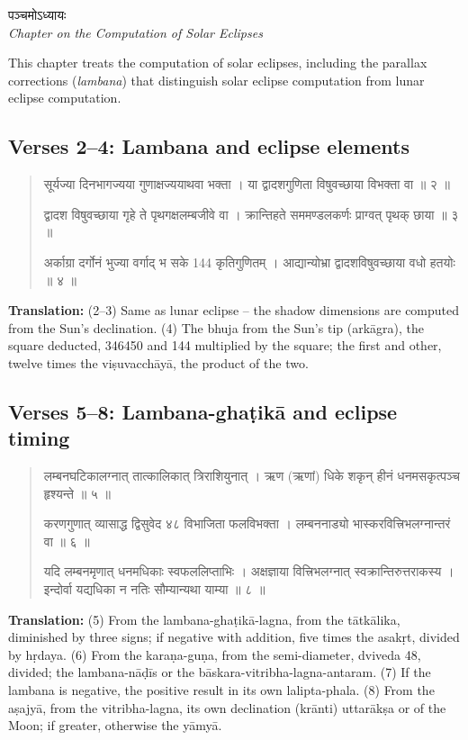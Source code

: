 \documentclass[11pt,a4paper]{article}
\newcommand{\dev}[1]{{\devanagarifont #1}}
\newenvironment{sanskritverse}{%
  \begin{quote}%
  \devanagarifont%
  \setlength{\leftmargin}{2em}%
}{\end{quote}}
\begin{document}
\begin{center}
\dev{पञ्चमोऽध्यायः}\\[0.2cm]
\textit{Chapter on the Computation of Solar Eclipses}
\end{center}

This chapter treats the computation of solar eclipses, including the parallax 
corrections (\textit{lambana}) that distinguish solar eclipse computation from lunar 
eclipse computation.

\subsection*{Verses 2--4: Lambana and eclipse elements}

\begin{sanskritverse}
\dev{सूर्यज्या दिनभागज्यया गुणाक्षज्ययाथवा भक्ता} ।
\dev{या द्वादशगुणिता विषुवच्छाया विभक्ता वा ॥ २ ॥}

\dev{द्वादश विषुवच्छाया गृहे ते पृथगक्षलम्बजीवे वा} ।
\dev{क्रान्तिहते सममण्डलकर्णः प्राग्वत् पृथक् छाया ॥ ३ ॥}

\dev{अर्काग्रा दर्गोनं भुज्या वर्गाद् भ सके 144 कृतिगुणितम्} ।
\dev{आद्यान्योभ्रा द्वादशविषुवच्छाया वधो हतयोः ॥ ४ ॥}
\end{sanskritverse}

\textbf{Translation:} (2--3) Same as lunar eclipse -- the shadow dimensions are computed 
from the Sun's declination. (4) The bhuja from the Sun's tip (arkāgra), the square 
deducted, 346450 and 144 multiplied by the square; the first and other, twelve times 
the viṣuvacchāyā, the product of the two.

\subsection*{Verses 5--8: Lambana-ghaṭikā and eclipse timing}

\begin{sanskritverse}
\dev{लम्बनघटिकालग्नात् तात्कालिकात् त्रिराशियुनात्} ।
\dev{ऋण (ऋणां) धिके शकृन् हीनं धनमसकृत्पञ्च हृश्यन्ते ॥ ५ ॥}

\dev{करणगुणात् व्यासाद्ध द्विसुवेद ४८ विभाजिता फलविभक्ता} ।
\dev{लम्बननाड्यो भास्करवित्त्रिभलग्नान्तरं वा ॥ ६ ॥}

\dev{यदि लम्बनमृणात् धनमधिकाः स्वफललिप्ताभिः} ।
\dev{अक्षज्ञाया वित्त्रिभलग्नात् स्वक्रान्तिरुत्तराकस्य} ।
\dev{इन्दोर्वा यद्यधिका न नतिः सौम्यान्यथा याम्या ॥ ८ ॥}
\end{sanskritverse}

\textbf{Translation:} (5) From the lambana-ghaṭikā-lagna, from the tātkālika, 
diminished by three signs; if negative with addition, five times the asakṛt, 
divided by hṛdaya. (6) From the karaṇa-guṇa, from the semi-diameter, dviveda 48, 
divided; the lambana-nāḍīs or the bāskara-vitribha-lagna-antaram. (7) If the lambana 
is negative, the positive result in its own lalipta-phala. (8) From the aṣajyā, 
from the vitribha-lagna, its own declination (krānti) uttarākṣa or of the Moon; 
if greater, otherwise the yāmyā.
\end{document}
